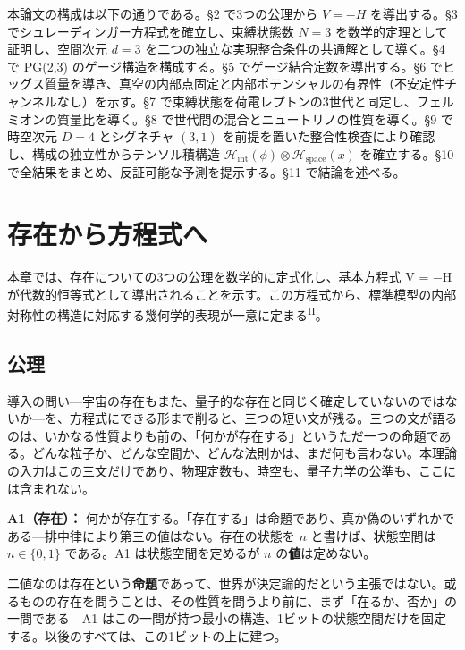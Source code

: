 \documentclass[fontsize=11pt,paper=a4,lualatex]{jlreq}
\newcommand{\PII}{\textsuperscript{\textup{II}}}
\begin{document}
本論文の構成は以下の通りである。§2 で3つの公理から $V = -H$
を導出する。§3 でシュレーディンガー方程式を確立し、束縛状態数 $N = 3$
を数学的定理として証明し、空間次元 $d = 3$
を二つの独立な実現整合条件の共通解として導く。§4 で PG(2,3)
のゲージ構造を構成する。§5 でゲージ結合定数を導出する。§6 でヒッグス質量を導き、真空の内部点固定と内部ポテンシャルの有界性（不安定性チャンネルなし）を示す。§7 で束縛状態を荷電レプトンの3世代と同定し、フェルミオンの質量比を導く。§8 で世代間の混合とニュートリノの性質を導く。§9 で時空次元 $D = 4$ とシグネチャ $(3,1)$ を前提を置いた整合性検査により確認し、構成の独立性からテンソル積構造 $\mathcal{H}_\mathrm{int}(\phi) \otimes \mathcal{H}_\mathrm{space}(x)$ を確立する。§10
で全結果をまとめ、反証可能な予測を提示する。§11 で結論を述べる。



\section{存在から方程式へ}\label{ux5b58ux5728ux304bux3089ux65b9ux7a0bux5f0fux3078}

本章では、存在についての3つの公理を数学的に定式化し、基本方程式 V = −H が代数的恒等式として導出されることを示す。この方程式から、標準模型の内部対称性の構造に対応する幾何学的表現が一意に定まる\PII{}。

\subsection{公理}\label{ux516cux7406}

導入の問い---宇宙の存在もまた、量子的な存在と同じく確定していないのではないか---を、方程式にできる形まで削ると、三つの短い文が残る。三つの文が語るのは、いかなる性質よりも前の、「何かが存在する」というただ一つの命題である。どんな粒子か、どんな空間か、どんな法則かは、まだ何も言わない。本理論の入力はこの三文だけであり、物理定数も、時空も、量子力学の公準も、ここには含まれない。

\textbf{A1（存在）：} 何かが存在する。「存在する」は命題であり、真か偽のいずれかである---排中律により第三の値はない。存在の状態を $n$ と書けば、状態空間は $n \in \{0,1\}$ である。A1 は状態空間を定めるが $n$ の\textbf{値}は定めない。

二値なのは存在という\textbf{命題}であって、世界が決定論的だという主張ではない。或るものの存在を問うことは、その性質を問うより前に、まず「在るか、否か」の一問である---A1 はこの一問が持つ最小の構造、1ビットの状態空間だけを固定する。以後のすべては、この1ビットの上に建つ。
\end{document}
